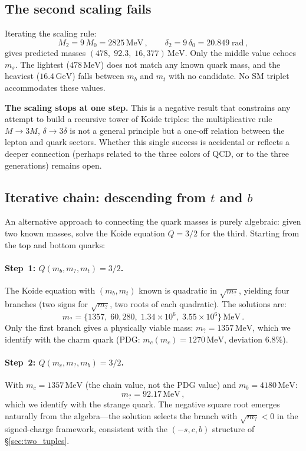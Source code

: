 \documentclass[12pt,a4paper]{article}
\newcommand{\MeV}{\,\text{MeV}}
\newcommand{\GeV}{\,\text{GeV}}
\begin{document}
\subsection{The second scaling fails}
Iterating the scaling rule:
\begin{equation}
M_2 = 9\,M_0 = 2825\MeV\,, \qquad
\delta_2 = 9\,\delta_0 = 20.849\;\text{rad}\,,
\end{equation}
gives predicted masses $(478,\; 92.3,\; 16{,}377)\MeV$. Only the
middle value echoes $m_s$. The lightest ($478\MeV$) does not match
any known quark mass, and the heaviest ($16.4\GeV$) falls between
$m_b$ and $m_t$ with no candidate. No SM triplet accommodates these
values.

\textbf{The scaling stops at one step.} This is a negative result
that constrains any attempt to build a recursive tower of Koide
triples: the multiplicative rule $M \to 3M$, $\delta \to 3\delta$
is not a general principle but a one-off relation between the lepton
and quark sectors. Whether this single success is accidental or
reflects a deeper connection (perhaps related to the three colors
of QCD, or to the three generations) remains open.

\subsection{Iterative chain: descending from $t$ and $b$}
\label{subsec:chain}

An alternative approach to connecting the quark masses is purely
algebraic: given two known masses, solve the Koide equation
$Q = 3/2$ for the third. Starting from the top and bottom quarks:

\paragraph{Step~1: $Q(m_b, m_?, m_t) = 3/2$.}
The Koide equation with $(m_b, m_t)$ known is quadratic in
$\sqrt{m_?}$, yielding four branches (two signs for $\sqrt{m_?}$,
two roots of each quadratic). The solutions are:
\begin{equation}
m_? = \{1357,\; 60{,}280,\; 1.34 \times 10^6,\;
3.55 \times 10^6\}\MeV\,.
\end{equation}
Only the first branch gives a physically viable mass:
$m_? = 1357\MeV$, which we identify with the charm quark
(PDG: $m_c(m_c) = 1270\MeV$, deviation $6.8\%$).

\paragraph{Step~2: $Q(m_c, m_?, m_b) = 3/2$.}
With $m_c = 1357\MeV$ (the chain value, not the PDG value) and
$m_b = 4180\MeV$:
\begin{equation}
m_? = 92.17\MeV\,,
\end{equation}
which we identify with the strange quark. The negative square root
emerges naturally from the algebra---the solution selects the branch
with $\sqrt{m_?} < 0$ in the signed-charge framework, consistent
with the $(-s, c, b)$ structure of \S\ref{sec:two_tuples}.
\end{document}
